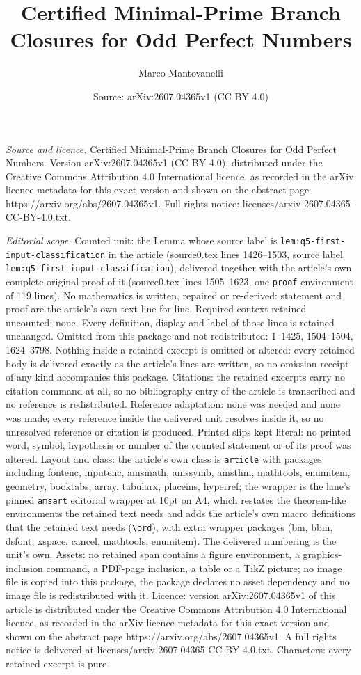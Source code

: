 \documentclass[10pt,a4paper]{amsart}
\title[Certified Minimal-Prime Branch Closures for Odd Perfect Numb]{Certified Minimal-Prime Branch Closures for Odd Perfect Numbers}
\author{Marco Mantovanelli}
\date{Source: arXiv:2607.04365v1 (CC BY 4.0)}
\begin{document}
\maketitle

\noindent\emph{Source and licence.} Certified Minimal-Prime Branch Closures for Odd Perfect Numbers. Version arXiv:2607.04365v1 (CC BY 4.0), distributed under the Creative Commons Attribution 4.0 International licence, as recorded in the arXiv licence metadata for this exact version and shown on the abstract page https://arxiv.org/abs/2607.04365v1. Full rights notice: licenses/arxiv-2607.04365-CC-BY-4.0.txt.\par\smallskip

\noindent\textit{Editorial scope.} Counted unit: the Lemma whose source label is \texttt{lem:q5-first-input-classification} in the article (source0.tex lines 1426--1503, source label \texttt{lem:q5-first-input-classification}), delivered together with the article's own complete original proof of it (source0.tex lines 1505--1623, one \texttt{proof} environment of 119 lines). No mathematics is written, repaired or re-derived: statement and proof are the article's own text line for line. Required context retained uncounted: none. Every definition, display and label of those lines is retained unchanged. Omitted from this package and not redistributed: 1--1425, 1504--1504, 1624--3798. Nothing inside a retained excerpt is omitted or altered: every retained body is delivered exactly as the article's lines are written, so no omission receipt of any kind accompanies this package. Citations: the retained excerpts carry no citation command at all, so no bibliography entry of the article is transcribed and no reference is redistributed. Reference adaptation: none was needed and none was made; every reference inside the delivered unit resolves inside it, so no unresolved reference or citation is produced. Printed slips kept literal: no printed word, symbol, hypothesis or number of the counted statement or of its proof was altered. Layout and class: the article's own class is \texttt{article} with packages including fontenc, inputenc, amsmath, amssymb, amsthm, mathtools, enumitem, geometry, booktabs, array, tabularx, placeins, hyperref; the wrapper is the lane's pinned \texttt{amsart} editorial wrapper at 10pt on A4, which restates the theorem-like environments the retained text needs and adds the article's own macro definitions that the retained text needs (\texttt{\textbackslash ord}), with extra wrapper packages (bm, bbm, dsfont, xspace, cancel, mathtools, enumitem). The delivered numbering is the unit's own. Assets: no retained span contains a figure environment, a graphics-inclusion command, a PDF-page inclusion, a table or a TikZ picture; no image file is copied into this package, the package declares no asset dependency and no image file is redistributed with it. Licence: version arXiv:2607.04365v1 of this article is distributed under the Creative Commons Attribution 4.0 International licence, as recorded in the arXiv licence metadata for this exact version and shown on the abstract page https://arxiv.org/abs/2607.04365v1. A full rights notice is delivered at licenses/arxiv-2607.04365-CC-BY-4.0.txt. Characters: every retained excerpt is pure 
\end{document}
